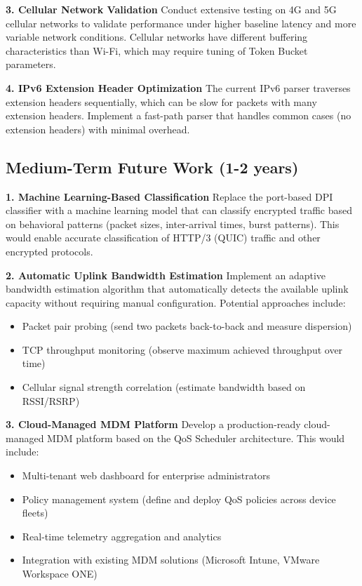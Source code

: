 \textbf{3. Cellular Network Validation}
Conduct extensive testing on 4G and 5G cellular networks to validate performance under higher baseline latency and more variable network conditions. Cellular networks have different buffering characteristics than Wi-Fi, which may require tuning of Token Bucket parameters.

\textbf{4. IPv6 Extension Header Optimization}
The current IPv6 parser traverses extension headers sequentially, which can be slow for packets with many extension headers. Implement a fast-path parser that handles common cases (no extension headers) with minimal overhead.

\subsection{Medium-Term Future Work (1-2 years)}

\textbf{1. Machine Learning-Based Classification}
Replace the port-based DPI classifier with a machine learning model that can classify encrypted traffic based on behavioral patterns (packet sizes, inter-arrival times, burst patterns). This would enable accurate classification of HTTP/3 (QUIC) traffic and other encrypted protocols.

\textbf{2. Automatic Uplink Bandwidth Estimation}
Implement an adaptive bandwidth estimation algorithm that automatically detects the available uplink capacity without requiring manual configuration. Potential approaches include:
\begin{itemize}
    \item Packet pair probing (send two packets back-to-back and measure dispersion)
    \item TCP throughput monitoring (observe maximum achieved throughput over time)
    \item Cellular signal strength correlation (estimate bandwidth based on RSSI/RSRP)
\end{itemize}

\textbf{3. Cloud-Managed MDM Platform}
Develop a production-ready cloud-managed MDM platform based on the QoS Scheduler architecture. This would include:
\begin{itemize}
    \item Multi-tenant web dashboard for enterprise administrators
    \item Policy management system (define and deploy QoS policies across device fleets)
    \item Real-time telemetry aggregation and analytics
    \item Integration with existing MDM solutions (Microsoft Intune, VMware Workspace ONE)
\end{itemize}

